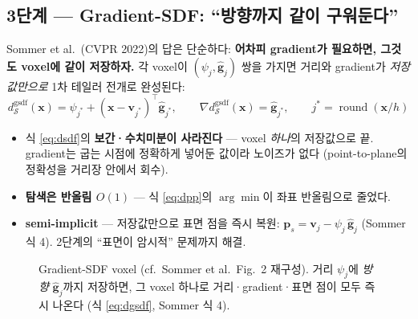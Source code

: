 \subsection{3단계 --- Gradient-SDF: ``방향까지 같이 구워둔다''}

Sommer et al.\ (CVPR 2022)의 답은 단순하다: \textbf{어차피 gradient가
필요하면, 그것도 voxel에 같이 저장하자.} 각 voxel이 $(\psi_j,
\hat{\mathbf{g}}_j)$ 쌍을 가지면 거리와 gradient가 \emph{저장값만으로} 1차
테일러 전개로 완성된다:
\begin{equation}
  d_{\mathcal{S}}^{\text{gsdf}}(\mathbf{x})
  = \psi_{j^*} + (\mathbf{x}-\mathbf{v}_{j^*})^{\top}\hat{\mathbf{g}}_{j^*},
  \qquad
  \nabla d_{\mathcal{S}}^{\text{gsdf}}(\mathbf{x}) = \hat{\mathbf{g}}_{j^*},
  \qquad
  j^* = \operatorname{round}(\mathbf{x}/h)
  \label{eq:dgsdf}
\end{equation}
\begin{itemize}
  \item 식 \eqref{eq:dsdf}의 \textbf{보간·수치미분이 사라진다} --- voxel
  \emph{하나}의 저장값으로 끝. gradient는 굽는 시점에 정확하게 넣어둔
  값이라 노이즈가 없다 (point-to-plane의 정확성을 거리장 안에서 회수).
  \item \textbf{탐색은 반올림 $O(1)$} --- 식 \eqref{eq:dpp}의 $\arg\min$이
  좌표 반올림으로 줄었다.
  \item \textbf{semi-implicit} --- 저장값만으로 표면 점을 즉시 복원:
  $\mathbf{p}_s = \mathbf{v}_j - \psi_j\,\hat{\mathbf{g}}_j$ (Sommer 식 4).
  2단계의 ``표면이 암시적'' 문제까지 해결.
\end{itemize}

\begin{figure}[htbp]
\centering
{}
\caption{Gradient-SDF voxel (cf.\ Sommer et al.\ Fig.~2 재구성). 거리
$\psi_j$에 \emph{방향} $\hat{\mathbf{g}}_j$까지 저장하면, 그 voxel 하나로
거리·gradient·표면 점이 모두 즉시 나온다 (식 \ref{eq:dgsdf}, Sommer 식 4).}
\label{fig:gsdf-voxel}
\end{figure}

